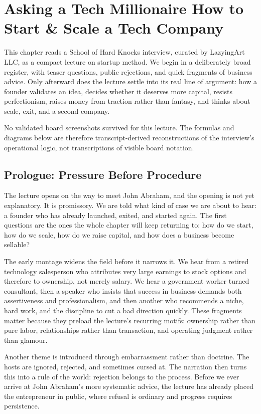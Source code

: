\chapter{Asking a Tech Millionaire How to Start \& Scale a Tech Company}

This chapter reads a School of Hard Knocks interview, curated by LazyingArt LLC, as a compact lecture on startup method. We begin in a deliberately broad register, with teaser questions, public rejections, and quick fragments of business advice. Only afterward does the lecture settle into its real line of argument: how a founder validates an idea, decides whether it deserves more capital, resists perfectionism, raises money from traction rather than fantasy, and thinks about scale, exit, and a second company.

\begin{remark}
No validated board screenshots survived for this lecture. The formulas and diagrams below are therefore transcript-derived reconstructions of the interview's operational logic, not transcriptions of visible board notation.
\end{remark}

\section{Prologue: Pressure Before Procedure}

The lecture opens on the way to meet John Abraham, and the opening is not yet explanatory. It is promissory. We are told what kind of case we are about to hear: a founder who has already launched, exited, and started again. The first questions are the ones the whole chapter will keep returning to: how do we start, how do we scale, how do we raise capital, and how does a business become sellable?

The early montage widens the field before it narrows it. We hear from a retired technology salesperson who attributes very large earnings to stock options and therefore to ownership, not merely salary. We hear a government worker turned consultant, then a speaker who insists that success in business demands both assertiveness and professionalism, and then another who recommends a niche, hard work, and the discipline to cut a bad direction quickly. These fragments matter because they preload the lecture's recurring motifs: ownership rather than pure labor, relationships rather than transaction, and operating judgment rather than glamour.

Another theme is introduced through embarrassment rather than doctrine. The hosts are ignored, rejected, and sometimes cursed at. The narration then turns this into a rule of the world: rejection belongs to the process. Before we ever arrive at John Abraham's more systematic advice, the lecture has already placed the entrepreneur in public, where refusal is ordinary and progress requires persistence.

